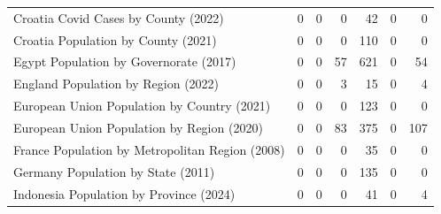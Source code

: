 \begin{tabular}{lrrr|rrr}
                     Croatia Covid Cases by County (2022) &                           0 &                           0 &                              0 &                             42 &                              0 &                                 0 \\
                      Croatia Population by County (2021) &                           0 &                           0 &                              0 &                            110 &                              0 &                                 0 \\
                   Egypt Population by Governorate (2017) &                           0 &                           0 &                             57 &                            621 &                              0 &                                54 \\
                      England Population by Region (2022) &                           0 &                           0 &                              3 &                             15 &                              0 &                                 4 \\
              European Union Population by Country (2021) &                           0 &                           0 &                              0 &                            123 &                              0 &                                 0 \\
               European Union Population by Region (2020) &                           0 &                           0 &                             83 &                            375 &                              0 &                               107 \\
          France Population by Metropolitan Region (2008) &                           0 &                           0 &                              0 &                             35 &                              0 &                                 0 \\
                       Germany Population by State (2011) &                           0 &                           0 &                              0 &                            135 &                              0 &                                 0 \\
                  Indonesia Population by Province (2024) &                           0 &                           0 &                              0 &                             41 &                              0 &                                 4 \\

\end{tabular}
